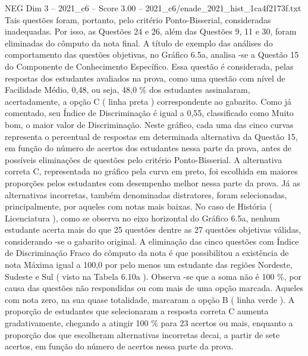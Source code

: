 \begin{textsample}{NEG Dim 3 – 2021\_c6 – Score 3.00 – 2021\_c6/enade\_2021\_hist\_1ca4f2173f.txt}
Tais questões foram, portanto, pelo critério Ponto-Bisserial, consideradas inadequadas.
Por isso, as Questões 24 e 26, além das Questões 9, 11 e 30, foram eliminadas do cômputo da nota final.
A título de exemplo das análises do comportamento das questões objetivas, no Gráfico 6.5a, analisa -se a Questão 15 do Componente de Conhecimento Específico.
Essa questão é considerada, pelas respostas dos estudantes avaliados na prova, como uma questão com nível de Facilidade Médio, 0,48, ou seja, 48,0 \% dos estudantes assinalaram, acertadamente, a opção C ( linha preta ) correspondente ao gabarito.
Como já comentado, seu Índice de Discriminação é igual a 0,55, classificado como Muito bom, o maior valor de Discriminação.
Neste gráfico, cada uma das cinco curvas representa o percentual de respostas em determinada alternativa da Questão 15, em função do número de acertos dos estudantes nessa parte da prova, antes de possíveis eliminações de questões pelo critério Ponto-Bisserial.
A alternativa correta C, representada no gráfico pela curva em preto, foi escolhida em maiores proporções pelos estudantes com desempenho melhor nessa parte da prova.
Já as alternativas incorretas, também denominadas distratores, foram selecionadas, principalmente, por aqueles com notas mais baixas.
No caso de História ( Licenciatura ), como se observa no eixo horizontal do Gráfico 6.5a, nenhum estudante acerta mais do que 25 questões dentre as 27 questões objetivas válidas, considerando -se o gabarito original.
A eliminação das cinco questões com Índice de Discriminação Fraco do cômputo da nota é que possibilitou a existência de nota Máxima igual a 100,0 por pelo menos um estudante das regiões Nordeste, Sudeste e Sul ( visto na Tabela 6.10a ).
Observa -se que a soma não é 100 \%, por causa das questões não respondidas ou com mais de uma opção marcada.
Aqueles com nota zero, na sua quase totalidade, marcaram a opção B ( linha verde ).
A proporção de estudantes que selecionaram a resposta correta C aumenta gradativamente, chegando a atingir 100 \% para 23 acertos ou mais, enquanto a proporção dos que escolheram alternativas incorretas decai, a partir de sete acertos, em função do número de acertos nessa parte da prova.

\end{textsample}
